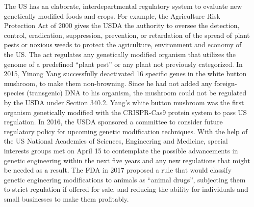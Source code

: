 The US has an elaborate, interdepartmental regulatory system to evaluate new genetically modified foods and crops. For example, the Agriculture Risk Protection Act of 2000 gives the USDA the authority to oversee the detection, control, eradication, suppression, prevention, or retardation of the spread of plant pests or noxious weeds to protect the agriculture, environment and economy of the US. The act regulates any genetically modified organism that utilizes the genome of a predefined ``plant pest'' or any plant not previously categorized. In 2015, Yinong Yang successfully deactivated 16 specific genes in the white button mushroom, to make them non-browning. Since he had not added any foreign-species (transgenic) DNA to his organism, the mushroom could not be regulated by the USDA under Section 340.2. Yang's white button mushroom was the first organism genetically modified with the CRISPR-Cas9 protein system to pass US regulation. In 2016, the USDA sponsored a committee to consider future regulatory policy for upcoming genetic modification techniques. With the help of the US National Academies of Sciences, Engineering and Medicine, special interests groups met on April 15 to contemplate the possible advancements in genetic engineering within the next five years and any new regulations that might be needed as a result. The FDA in 2017 proposed a rule that would classify genetic engineering modifications to animals as ``animal drugs'', subjecting them to strict regulation if offered for sale, and reducing the ability for individuals and small businesses to make them profitably.


